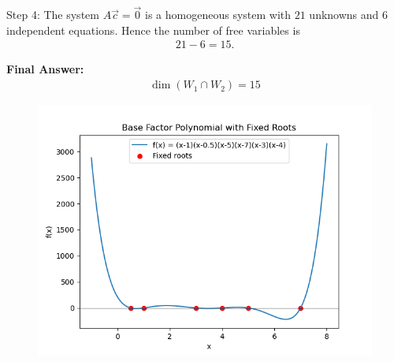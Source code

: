 \documentclass[12pt]{article}
\begin{document}
\noindent
Step 4: The system $A\vec{c}=\vec{0}$ is a homogeneous system with $21$ unknowns 
and $6$ independent equations. Hence the number of free variables is
\begin{align}
21 - 6 = 15.
\end{align}

\noindent
\textbf{Final Answer:}
\begin{align}
\dim(W_1 \cap W_2) = 15
\end{align}

\begin{figure}[H]
    \centering
    \includegraphics[width=0.9\columnwidth]{figs/poly_dim.png}
    \caption{}
    \label{fig:placeholder}
\end{figure}
\end{document}
